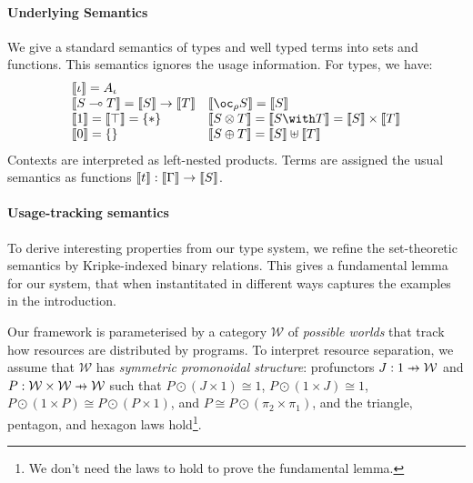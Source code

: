 \paragraph{Underlying Semantics} We give a standard semantics of types
and well typed terms into sets and functions. This semantics ignores
the usage information. For types, we have:
\begin{displaymath}
  \begin{array}{ll}
    \llbracket \base \rrbracket = A_\base \\
    \llbracket \fun{S}{T} \rrbracket = \llbracket S \rrbracket \rightarrow \llbracket T \rrbracket &
    \llbracket \excl{\rho}{S} \rrbracket = \llbracket S \rrbracket \\
    \llbracket \tensorOne \rrbracket = \llbracket \withTOne \rrbracket = \{*\} &
    \llbracket \tensor{S}{T} \rrbracket = \llbracket \withT{S}{T} \rrbracket = \llbracket S \rrbracket \times \llbracket T \rrbracket \\
    \llbracket \sumTZero \rrbracket = \{\} &
    \llbracket \sumT{S}{T} \rrbracket = \llbracket S \rrbracket \uplus \llbracket T \rrbracket \\
  \end{array}
\end{displaymath}
Contexts are interpreted as left-nested products. Terms are assigned
the usual semantics as functions $\llbracket t \rrbracket : \llbracket \Gamma \rrbracket \to \llbracket S \rrbracket$.

\paragraph{Usage-tracking semantics} To derive interesting properties
from our type system, we refine the set-theoretic semantics by
Kripke-indexed binary relations. This gives a fundamental lemma for
our system, that when instantitated in different ways captures the
examples in the introduction.

Our framework is parameterised by a category $\mathcal{W}$ of
\emph{possible worlds} that track how resources are distributed by
programs. To interpret resource separation, we assume that
$\mathcal{W}$ has \emph{symmetric promonoidal structure}: profunctors
$J : 1 \tobar \mathcal{W}$ and
$P : \mathcal{W} \times \mathcal{W} \tobar \mathcal{W}$ such
that $P \odot (J \times 1) \cong 1$, $P \odot (1 \times J) \cong 1$,
$P \odot (1 \times P) \cong P \odot (P \times 1)$, and
$P \cong P \odot (\pi_2 \times \pi_1)$, and the triangle, pentagon,
and hexagon laws hold\footnote{We don't need the laws to hold to prove
  the fundamental lemma.}.

